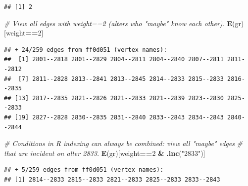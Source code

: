 \documentclass[
]{book}
\newenvironment{Shaded}{\begin{snugshade}}{\end{snugshade}}
\newcommand{\CommentTok}[1]{\textcolor[rgb]{0.56,0.35,0.01}{\textit{#1}}}
\newcommand{\DecValTok}[1]{\textcolor[rgb]{0.00,0.00,0.81}{#1}}
\newcommand{\FunctionTok}[1]{\textcolor[rgb]{0.13,0.29,0.53}{\textbf{#1}}}
\newcommand{\NormalTok}[1]{#1}
\newcommand{\SpecialCharTok}[1]{\textcolor[rgb]{0.81,0.36,0.00}{\textbf{#1}}}
\newcommand{\StringTok}[1]{\textcolor[rgb]{0.31,0.60,0.02}{#1}}
\begin{document}
\begin{verbatim}
## [1] 2
\end{verbatim}

\begin{Shaded}
\begin{Highlighting}[]
\CommentTok{\# View all edges with weight==2 (alters who "maybe" know each other).}
\FunctionTok{E}\NormalTok{(gr)[weight}\SpecialCharTok{==}\DecValTok{2}\NormalTok{] }
\end{Highlighting}
\end{Shaded}

\begin{verbatim}
## + 24/259 edges from ff0d051 (vertex names):
##  [1] 2801--2818 2801--2829 2804--2811 2804--2840 2807--2811 2811--2812
##  [7] 2811--2828 2813--2841 2813--2845 2814--2833 2815--2833 2816--2835
## [13] 2817--2835 2821--2826 2821--2833 2821--2839 2823--2830 2825--2833
## [19] 2827--2828 2830--2835 2831--2840 2833--2843 2834--2843 2840--2844
\end{verbatim}

\begin{Shaded}
\begin{Highlighting}[]
\CommentTok{\# Conditions in R indexing can always be combined: view all "maybe" edges}
\CommentTok{\# that are incident on alter 2833.}
\FunctionTok{E}\NormalTok{(gr)[weight}\SpecialCharTok{==}\DecValTok{2} \SpecialCharTok{\&} \FunctionTok{.inc}\NormalTok{(}\StringTok{"2833"}\NormalTok{)]}
\end{Highlighting}
\end{Shaded}

\begin{verbatim}
## + 5/259 edges from ff0d051 (vertex names):
## [1] 2814--2833 2815--2833 2821--2833 2825--2833 2833--2843
\end{verbatim}

\begin{Shaded}
\end{Shaded}
\end{document}
